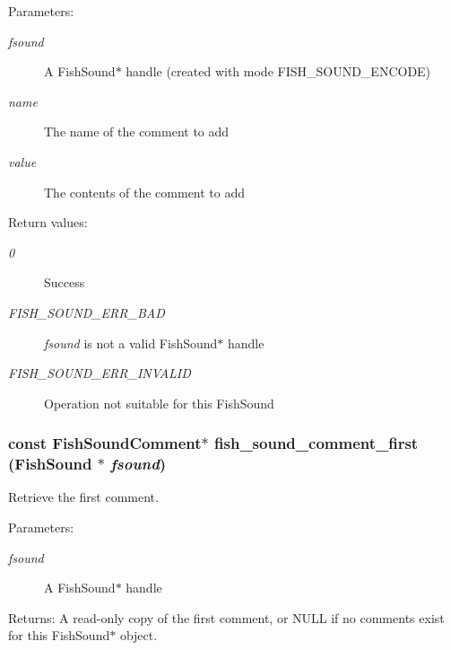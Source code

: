 \begin{Desc}
\item[Parameters:]
\begin{description}
\item[{\em fsound}]A Fish\-Sound$\ast$ handle (created with mode FISH\_\-SOUND\_\-ENCODE) \item[{\em name}]The name of the comment to add \item[{\em value}]The contents of the comment to add \end{description}
\end{Desc}
\begin{Desc}
\item[Return values:]
\begin{description}
\item[{\em 0}]Success \item[{\em FISH\_\-SOUND\_\-ERR\_\-BAD}]{\em fsound\/} is not a valid Fish\-Sound$\ast$ handle \item[{\em FISH\_\-SOUND\_\-ERR\_\-INVALID}]Operation not suitable for this Fish\-Sound \end{description}
\end{Desc}
\subsubsection{\setlength{\rightskip}{0pt plus 5cm}const {\bf Fish\-Sound\-Comment}$\ast$ fish\_\-sound\_\-comment\_\-first ({\bf Fish\-Sound} $\ast$ {\em fsound})}\label{comments_8h_a1}


Retrieve the first comment. 

\begin{Desc}
\item[Parameters:]
\begin{description}
\item[{\em fsound}]A Fish\-Sound$\ast$ handle \end{description}
\end{Desc}
\begin{Desc}
\item[Returns:]A read-only copy of the first comment, or NULL if no comments exist for this Fish\-Sound$\ast$ object. \end{Desc}
